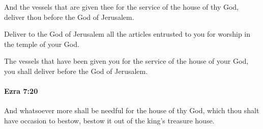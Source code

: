 			\begin{versebox}
					\item[BHS] 
					\item[LXX] 
					\item[ASV] And the vessels that are given thee for the service of the house of thy God, deliver thou before the God of Jerusalem.
					\item[NIV] Deliver to the God of Jerusalem all the articles entrusted to you for worship in the temple of your God.
					\item[NRSV] The vessels that have been given you for the service of the house of your God, you shall deliver before the God of Jerusalem.
			\end{versebox}

		\paragraph{Ezra 7:20} %
			\label{EZRA-7-20}

			And whatsoever more shall be needful for the house of thy God, which thou shalt have occasion to bestow, bestow it out of the king’s treasure house.

